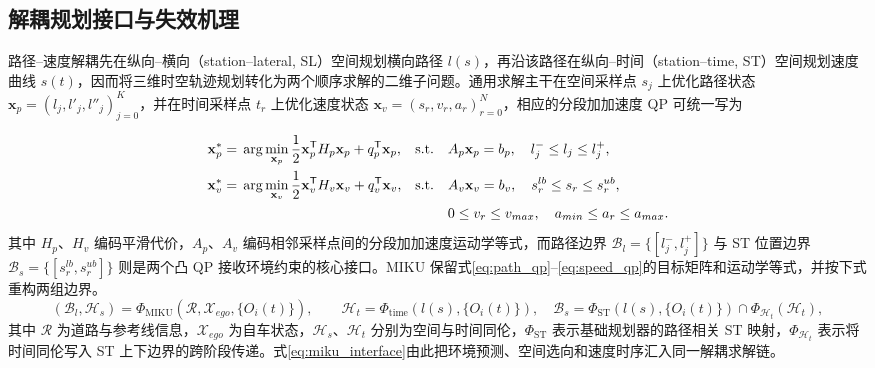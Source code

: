 \documentclass[a4paper,zihao=5]{ctexart}
\theoremstyle{definition}
\begin{document}
\subsection{解耦规划接口与失效机理}
\label{subsec:decouple_formalize}

路径--速度解耦先在纵向--横向（station--lateral, SL）空间规划横向路径 $l(s)$，再沿该路径在纵向--时间（station--time, ST）空间规划速度曲线 $s(t)$，因而将三维时空轨迹规划转化为两个顺序求解的二维子问题。通用求解主干在空间采样点 $s_j$ 上优化路径状态 $\mathbf x_p=(l_j,l'_j,l''_j)_{j=0}^{K}$，并在时间采样点 $t_r$ 上优化速度状态 $\mathbf x_v=(s_r,v_r,a_r)_{r=0}^{N}$，相应的分段加加速度 QP 可统一写为\citep{fan2018baidu,zhou2021pathqp}

\begin{align}
 \mathbf x_p^*={}&\arg\min_{\mathbf x_p}
 \frac{1}{2}\mathbf x_p^{\mathsf T}H_p\mathbf x_p+q_p^{\mathsf T}\mathbf x_p,
 &\mathrm{s.t.}\quad&A_p\mathbf x_p=b_p,\quad l_j^-\leq l_j\leq l_j^+, \label{eq:path_qp}\\
 \mathbf x_v^*={}&\arg\min_{\mathbf x_v}
 \frac{1}{2}\mathbf x_v^{\mathsf T}H_v\mathbf x_v+q_v^{\mathsf T}\mathbf x_v,
 &\mathrm{s.t.}\quad&A_v\mathbf x_v=b_v,\quad s_r^{lb}\leq s_r\leq s_r^{ub}, \notag\\
 &&&0\leq v_r\leq v_{max},\quad a_{min}\leq a_r\leq a_{max}. \label{eq:speed_qp}
\end{align}
其中 $H_p$、$H_v$ 编码平滑代价，$A_p$、$A_v$ 编码相邻采样点间的分段加加速度运动学等式，而路径边界 $\mathcal B_l=\{[l_j^-,l_j^+]\}$ 与 ST 位置边界 $\mathcal B_s=\{[s_r^{lb},s_r^{ub}]\}$ 则是两个凸 QP 接收环境约束的核心接口。MIKU 保留式\eqref{eq:path_qp}--\eqref{eq:speed_qp}的目标矩阵和运动学等式，并按下式重构两组边界。
\begin{equation}
 (\mathcal B_l,\mathcal H_s)=\Phi_{\mathrm{MIKU}}(\mathcal R,\mathcal X_{ego},\{O_i(t)\}),
 \qquad
 \mathcal H_t=\Phi_{\mathrm{time}}(l(s),\{O_i(t)\}),\quad
 \mathcal B_s=\Phi_{\mathrm{ST}}(l(s),\{O_i(t)\})\cap\Phi_{\mathcal H_t}(\mathcal H_t),
 \label{eq:miku_interface}
\end{equation}
其中 $\mathcal R$ 为道路与参考线信息，$\mathcal X_{ego}$ 为自车状态，$\mathcal H_s$、$\mathcal H_t$ 分别为空间与时间同伦，$\Phi_{\mathrm{ST}}$ 表示基础规划器的路径相关 ST 映射，$\Phi_{\mathcal H_t}$ 表示将时间同伦写入 ST 上下边界的跨阶段传递。式\eqref{eq:miku_interface}由此把环境预测、空间选向和速度时序汇入同一解耦求解链。
\end{document}
